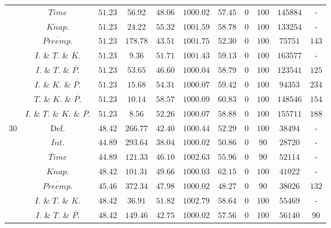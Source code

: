 \documentclass{article}
\begin{document}
\begin{table}[!htb]
{\begin{tabular}{|c|c|c|cc|cccccc|}
                             & $Time$  & $51.23$ & $56.92$ & $48.06$ & $1000.02$ & $57.45$ & $0$ & $100$ & $145884$ & - \\ 
                             & $Knap.$  &$51.23$ & $24.22$ & $55.32$ & $1001.59$ & $58.78$ & $0$ & $100$ & $133254$ & - \\  
                             & $\overline{Preemp.}$&$51.23$ & $178.78$ & $43.51$ & $1001.75$ & $52.30$ & $0$ & $100$ & $75751$ & $143 $ \\ 
                             & $I.$ \& $T.$ \& $K.$ &$51.23$ & $9.36$ & $51.71$ & $1001.43$ & $59.13$ & $0$ & $100$ & $163577$ & - \\ 
                             & $I.$ \& $T.$ \& $\overline{P.}$  & $51.23$ & $53.65$ & $46.60$ & $1000.04$ & $58.79$ & $0$ & $100$ & $123541$ & $125 $ \\ 
                             & $I.$ \& $K.$ \& $\overline{P.}$  &$51.23$ & $15.68$ & $54.31$ & $1000.07$ & $59.42$ & $0$ & $100$ & $94353$ & $234 $ \\ 
                             & $T.$ \& $K.$ \& $\overline{P.}$  & $51.23$ & $10.14$ & $58.57$ & $1000.09$ & $60.83$ & $0$ & $100$ & $148546$ & $154 $ \\ 
                             & $I.$ \& $T.$ \& $K.$ \& $\overline{P.}$  & $51.23$ & $8.56$ & $52.26$ & $1000.07$ & $58.88$ & $0$ & $100$ & $155711$ & $188 $ \\ 
    \hline
    \multirow{10}{*}{30} &  Def. & $48.42$ & $266.77$ & $42.40$ & $1000.44$ & $52.29$ & $0$ & $100$ & $38494$ & - \\ 
                             & $Int.$ & $44.89$ & $293.64$ & $38.04$ & $1000.02$ & $50.86$ & $0$ & $90$ & $28720$ & - \\ 
                             & $Time$  & $44.89$ & $121.33$ & $46.10$ & $1002.63$ & $55.96$ & $0$ & $90$ & $52114$ & - \\ 
                             & $Knap.$  &$48.42$ & $101.31$ & $49.66$ & $1000.03$ & $62.15$ & $0$ & $100$ & $41022$ & - \\  
                             & $\overline{Preemp.}$&$45.46$ & $372.34$ & $47.98$ & $1000.02$ & $48.27$ & $0$ & $90$ & $38026$ & $132 $ \\ 
                             & $I.$ \& $T.$ \& $K.$ &$48.42$ & $36.91$ & $51.82$ & $1002.79$ & $58.64$ & $0$ & $100$ & $55469$ & - \\ 
                             & $I.$ \& $T.$ \& $\overline{P.}$  &$48.42$ & $149.46$ & $42.75$ & $1000.02$ & $57.56$ & $0$ & $100$ & $56140$ & $90 $ \\ 

\end{tabular}}
\end{table}
\end{document}
